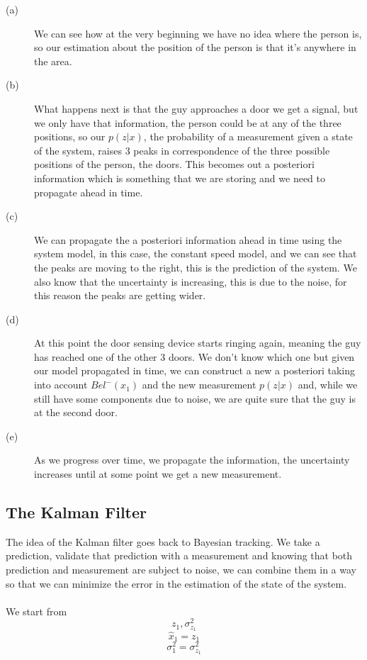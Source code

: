 \begin{description}

\item [(a)] We can see how at the very beginning we have no idea where the person is, so our estimation about the position of the person is that it's anywhere in the area.
\item [(b)] What happens next is that the guy approaches a door we get a signal, but we only have that information, the person could be at any of the three positions, so our $p(z|x)$, the probability of a measurement given a state of the system, raises 3 peaks in correspondence of the three possible positions of the person, the doors. This becomes out a posteriori information which is something that we are storing and we need to propagate ahead  in time.
\item [(c)] We can propagate the a posteriori information ahead in time using the system model, in this case, the constant speed model, and we can see that the peaks are moving to the right, this is the prediction of the system. We also know that the uncertainty is increasing, this is due to the noise, for this reason the peaks are getting wider.
\item [(d)] At this point the door sensing device starts ringing again, meaning the guy has reached one of the other 3 doors. We don't know which one but given our model propagated in time, we can construct a new a posteriori taking into account $Bel^{-}(x_1)$ and the new measurement $p(z|x)$ and, while we still have some components due to noise, we are quite sure that the guy is at the second door.
\item [(e)] As we progress over time, we propagate the information, the uncertainty increases until at some point we get a new measurement.
\end{description}

\subsection{The Kalman Filter}

The idea of the Kalman filter goes back to Bayesian tracking. We take a prediction, validate that prediction with a measurement and knowing that both prediction and measurement are subject to noise, we can combine them in a way so that we can minimize the error in the estimation of the state of the system.
\\\\
We start from
\[
    z_1, \sigma^2_{z_1}    
\]
\[
    \hat{x}_1 = z_1
\]
\[
    \sigma^2_1 = \sigma^2_{z_1}    
\]

